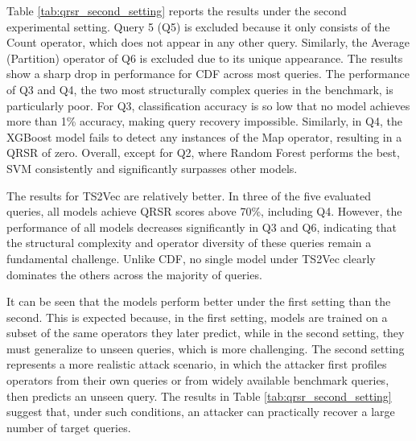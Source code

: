 Table \ref{tab:qrsr_second_setting} reports the results under the second experimental setting. Query 5 (Q5) is excluded because it only consists of the Count operator, which does not appear in any other query. Similarly, the Average (Partition) operator of Q6 is excluded due to its unique appearance. The results show a sharp drop in performance for CDF across most queries. The performance of Q3 and Q4, the two most structurally complex queries in the benchmark, is particularly poor. For Q3, classification accuracy is so low that no model achieves more than 1\% accuracy, making query recovery impossible. Similarly, in Q4, the XGBoost model fails to detect any instances of the Map operator, resulting in a QRSR of zero. Overall, except for Q2, where Random Forest performs the best, SVM consistently and significantly surpasses other models.

The results for TS2Vec are relatively better. In three of the five evaluated queries, all models achieve QRSR scores above 70\%, including Q4. However, the performance of all models decreases significantly in Q3 and Q6, indicating that the structural complexity and operator diversity of these queries remain a fundamental challenge. Unlike CDF, no single model under TS2Vec clearly dominates the others across the majority of queries.

It can be seen that the models perform better under the first setting than the second. This is expected because, in the first setting, models are trained on a subset of the same operators they later predict, while in the second setting, they must generalize to unseen queries, which is more challenging. The second setting represents a more realistic attack scenario, in which the attacker first profiles operators from their own queries or from widely available benchmark queries, then predicts an unseen query. The results in Table \ref{tab:qrsr_second_setting} suggest that, under such conditions, an attacker can practically recover a large number of target queries.


